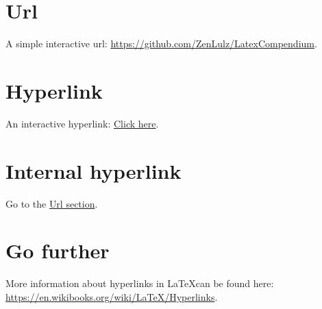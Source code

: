 \documentclass{article}
\begin{document}
\section*{Url}
\label{url}

A simple interactive url: \url{https://github.com/ZenLulz/LatexCompendium}.

\section*{Hyperlink}

An interactive hyperlink: \href{https://github.com/ZenLulz/LatexCompendium}{Click here}.

\section*{Internal hyperlink}

Go to the \hyperref[url]{Url section}.

\section*{Go further}

More information about hyperlinks in \LaTeX can be found here: \url{https://en.wikibooks.org/wiki/LaTeX/Hyperlinks}.
	
\end{document}
